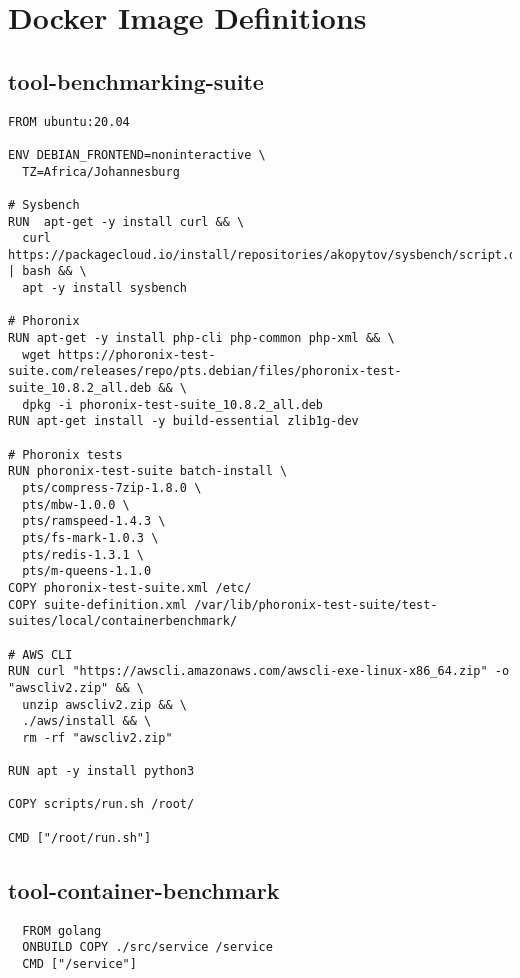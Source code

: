 \chapter{Docker Image Definitions}
\label{appendix:docker_images}

\section{tool-benchmarking-suite}

\begin{verbatim}
FROM ubuntu:20.04

ENV DEBIAN_FRONTEND=noninteractive \
  TZ=Africa/Johannesburg

# Sysbench
RUN  apt-get -y install curl && \
  curl https://packagecloud.io/install/repositories/akopytov/sysbench/script.deb.sh | bash && \
  apt -y install sysbench

# Phoronix 
RUN apt-get -y install php-cli php-common php-xml && \ 
  wget https://phoronix-test-suite.com/releases/repo/pts.debian/files/phoronix-test-suite_10.8.2_all.deb && \
  dpkg -i phoronix-test-suite_10.8.2_all.deb
RUN apt-get install -y build-essential zlib1g-dev 

# Phoronix tests
RUN phoronix-test-suite batch-install \
  pts/compress-7zip-1.8.0 \
  pts/mbw-1.0.0 \ 
  pts/ramspeed-1.4.3 \ 
  pts/fs-mark-1.0.3 \ 
  pts/redis-1.3.1 \ 
  pts/m-queens-1.1.0 
COPY phoronix-test-suite.xml /etc/
COPY suite-definition.xml /var/lib/phoronix-test-suite/test-suites/local/containerbenchmark/

# AWS CLI
RUN curl "https://awscli.amazonaws.com/awscli-exe-linux-x86_64.zip" -o "awscliv2.zip" && \
  unzip awscliv2.zip && \
  ./aws/install && \
  rm -rf "awscliv2.zip"

RUN apt -y install python3

COPY scripts/run.sh /root/

CMD ["/root/run.sh"]
\end{verbatim}

\section{tool-container-benchmark}
\begin{verbatim}
  FROM golang
  ONBUILD COPY ./src/service /service
  CMD ["/service"]
\end{verbatim}